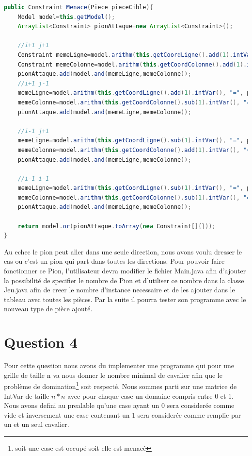 \documentclass[a4paper,10pt]{article}
\begin{document}
\begin{lstlisting}[language=Java,basicstyle=\tiny]
public Constraint Menace(Piece pieceCible){
	Model model=this.getModel();
	ArrayList<Constraint> pionAttaque=new ArrayList<Constraint>();
	
	//i+1 j+1
	Constraint memeLigne=model.arithm(this.getCoordLigne().add(1).intVar(), "=", pieceCible.getCoordLigne());
	Constraint memeColonne=model.arithm(this.getCoordColonne().add(1).intVar(), "=", pieceCible.getCoordColonne());
	pionAttaque.add(model.and(memeLigne,memeColonne));
	//i+1 j-1
	memeLigne=model.arithm(this.getCoordLigne().add(1).intVar(), "=", pieceCible.getCoordLigne());
	memeColonne=model.arithm(this.getCoordColonne().sub(1).intVar(), "=", pieceCible.getCoordColonne());
	pionAttaque.add(model.and(memeLigne,memeColonne));
	
	//i-1 j+1
	memeLigne=model.arithm(this.getCoordLigne().sub(1).intVar(), "=", pieceCible.getCoordLigne());
	memeColonne=model.arithm(this.getCoordColonne().add(1).intVar(), "=", pieceCible.getCoordColonne());
	pionAttaque.add(model.and(memeLigne,memeColonne));
	
	//i-1 i-1
	memeLigne=model.arithm(this.getCoordLigne().sub(1).intVar(), "=", pieceCible.getCoordLigne());
	memeColonne=model.arithm(this.getCoordColonne().sub(1).intVar(), "=", pieceCible.getCoordColonne());
	pionAttaque.add(model.and(memeLigne,memeColonne));
	
	return model.or(pionAttaque.toArray(new Constraint[]{}));
}
\end{lstlisting}

Au echec le pion peut aller dans une seule direction, nous avons voulu dresser le cas ou c'est un pion qui part dans toutes les directions. Pour pouvoir faire fonctionner ce Pion, l'utilisateur devra modifier le fichier Main.java afin d'ajouter la possibilité de specifier le nombre de Pion et d'utiliser ce nombre dans la classe Jeu.java afin de creer le nombre d'instance necessaire et de les ajouter dans le tableau avec toutes les pièces. Par la suite il pourra tester son programme avec le nouveau type de pièce ajouté.
\section{Question 4}
\par Pour cette question nous avons du implementer une programme qui pour une grille de taille n va nous donner le nombre minimal de cavalier afin que le problème de domination\footnote{soit une case est occupé soit elle est menacé} soit respecté. Nous sommes parti sur une matrice de IntVar de taille $n*n$ avec pour chaque case un domaine compris entre 0 et 1. Nous avons defini au prealable qu'une case ayant un 0 sera considerée comme vide et inversement une case contenant un 1 sera considerée comme remplie par un et un seul cavalier. 
\end{document}

